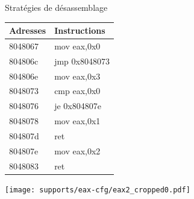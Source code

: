 \documentclass{beamer}
\begin{document}
\begin{frame}{Stratégies de désassemblage}
\begin{minipage}{.5\textwidth}
  \centering
  \begin{table}
  \begin{tabular}[b]{|l|l|}
  \hline
  Adresses & Instructions\\ 
  \hline
 8048067  &  mov    eax,0x0 \\
 804806c  &  jmp    0x8048073 \\
 804806e  &  mov    eax,0x3 \\
 8048073  &  cmp    eax,0x0 \\
 8048076  &  je     0x804807e \\
 8048078  &  mov    eax,0x1 \\
 804807d  &  ret     \\
 804807e  &  mov    eax,0x2 \\
 8048083  &  ret     \\
  \hline
  \end{tabular}
  \end{table}
\end{minipage}%
\begin{minipage}{.45\textwidth}
  \centering
  \texttt{[image: supports/eax-cfg/eax2\_cropped0.pdf]}
\end{minipage}



\end{frame}
\end{document}

